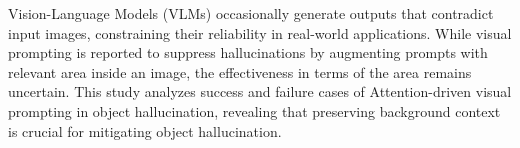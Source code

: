 Vision-Language Models (VLMs) occasionally generate outputs that contradict input images, constraining their reliability in real-world applications. While visual prompting is reported to suppress hallucinations by augmenting prompts with relevant area inside an image, the effectiveness in terms of the area remains uncertain. This study analyzes success and failure cases of Attention-driven visual prompting in object hallucination, revealing that preserving background context is crucial for mitigating object hallucination.
